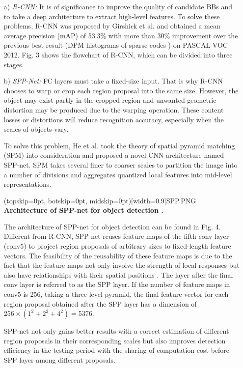 \documentclass[two column]{ieeeaccess}
\begin{document}
\begin{itemize}
    \item[a)]\textit{R-CNN: }It is of significance to improve the quality of candidate BBs and to take a deep architecture to extract high-level features. To solve these problems, R-CNN was proposed by Girshick et al. \cite{15} and obtained a mean average precision (mAP) of 53.3\% with more than 30\% improvement over the previous best result (DPM histograms of sparse codes \cite{77}) on PASCAL VOC 2012. Fig. 3 shows the flowchart of R-CNN, which can be divided into three stages. \\

     
    \item[b)]\textit{SPP-Net: }
    FC layers must take a fixed-size input. That is why R-CNN chooses to warp or crop each region proposal into the same size. However, the object may exist partly in the cropped region and unwanted geometric distortion may be produced due to the warping operation. These content losses or distortions will reduce recognition accuracy, especially when the scales of objects vary. 
    
    To solve this problem, He et al. \cite{64} took the theory of spatial pyramid matching (SPM) \cite{89,90} into consideration and proposed a novel CNN architecture named SPP-net. SPM takes several finer to coarser scales to partition the image into a number of divisions and aggregates quantized local features into mid-level representations. 
    
    \Figure[ht](topskip=0pt, botskip=0pt, midskip=0pt)[width=0.9\linewidth]{SPP.PNG} {\textbf{Architecture of SPP-net for object detection \cite{64}.}\label{fig4}}
    
    The architecture of SPP-net for object detection can be found in Fig. 4. Different from R-CNN, SPP-net reuses feature maps of the fifth conv layer (conv5) to project region proposals of arbitrary sizes to fixed-length feature vectors. The feasibility of the reusability of these feature maps is due to the fact that the feature maps not only involve the strength of local responses but also have relationships with their spatial positions \cite{64}. The layer after the final conv layer is referred to as the SPP layer. If the number of feature maps in conv5 is 256, taking a three-level pyramid, the final feature vector for each region proposal obtained after the SPP layer has a dimension of $256 \times (1^2 + 2^2 + 4^2) = 5376$. 
    
    SPP-net not only gains better results with a correct estimation of different region proposals in their corresponding scales but also improves detection efficiency in the testing period with the sharing of computation cost before SPP layer among different proposals.\\
    

\end{itemize}
\end{document}
